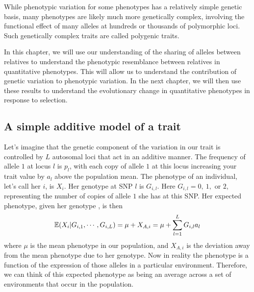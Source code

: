While phenotypic variation for some phenotypes has a relatively simple genetic basis, many phenotypes are likely much more genetically complex, involving the functional effect of many alleles at hundreds or thousands of polymorphic loci. Such genetically complex traits are called polygenic traits. 

In this chapter, we will use our understanding of the sharing of alleles between relatives to understand the phenotypic resemblance between relatives in
quantitative phenotypes. This will allow us to understand the contribution of genetic variation to phenotypic variation. In the next chapter, we will then use these results to understand the evolutionary change in quantitative phenotypes in response to selection. \\

\subsection{A simple additive model of a trait}
Let's imagine that the genetic component of the variation in our trait is controlled by $L$ autosomal loci that act in an additive manner. The frequency of allele $1$ at locus $l$ is $p_l$, with each copy of allele $1$ at this locus increasing your trait value by $a_l$ above the population mean.
The phenotype of an individual, let's call her $i$, is $X_i$.
Her genotype at SNP $l$ is
$G_{i,l}$. Here $G_{i,l}=0,~1,$ or $2$,  representing the number of copies of allele $1$ she
has at this SNP. Her expected phenotype, given her genotype , is then
\begin{equation}
\mathbb{E} (X_i | G_{i,1},\cdots,G_{i,L}) =\mu + X_{A,i} = \mu+\sum_{l=1}^L G_{i,l} a_{l} \label{pheno_geno}
\end{equation}
where $\mu$ is the mean phenotype in our population, and $X_{A,i}$ is
the deviation away from the mean phenotype due to her genotype. Now in reality the phenotype is a function of the
expression of those alleles in a particular environment. Therefore, we
can think of this expected phenotype as being an average across a set
of environments that occur in the population. \\



